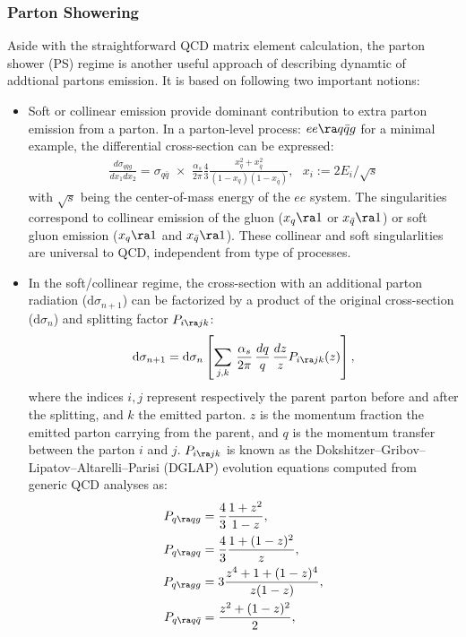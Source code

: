 \subsubsection{Parton Showering}
Aside with the straightforward  QCD matrix element calculation,
the parton shower (PS) regime is another useful approach of describing dynamtic of addtional partons emission.
It is based on following two important notions:

\begin{itemize}
\item Soft or collinear emission provide dominant contribution to extra parton emission from a parton.
In a parton-level process: $ee \ra q\bar{q} g$ for a minimal example, the differential cross-section can be expressed:
\begin{align}
\frac{d\sigma_{q\bar{q}g}}{dx_1 dx_2} = \sigma_{q\bar{q}} \,\, \times \,\, \frac{\alpha_s}{2\pi} \frac{4}{3} \frac{x_q^2+x_{\bar{q}}^2}{(1-x_q)(1-x_{\bar{q}})}, \,\,\,\, x_i := 2E_i/\sqrt{s}
\end{align}
with $\sqrt{s}$ being the center-of-mass energy of the $ee$ system.
The singularities correspond to collinear emission of the gluon ($x_q \ra 1$ or $x_{\bar{q}} \ra 1$) or soft gluon emission ($x_q \ra 1$ and $x_{\bar{q}} \ra 1$).
These collinear and soft singularlities are universal to QCD, independent from type of processes. \\

\item In the soft/collinear regime, the cross-section with an additional parton radiation ($\mathrm{d}\sigma_{n+1}$) can be factorized by a product of the original cross-section ($\mathrm{d}\sigma_{n}$) and splitting factor $P_{i \ra j k}$:
\begin{align}
\mathrm{d}\sigma_{n+1} = \mathrm{d}\sigma_n \left[ \sum_{j,k} \,  \frac{\alpha_s}{2\pi} \, \frac{dq}{q} \, \frac{dz}{z} P_{i \ra j k} (z) \right],
\end{align}
where the indices $i,j$ represent respectively the parent parton before and after the splitting, and $k$ the emitted parton. 
$z$ is the momentum fraction the emitted parton carrying from the parent, and $q$ is the momentum transfer between the parton $i$ and $j$. $P_{i \ra j k}$ is known as the Dokshitzer–Gribov–Lipatov–Altarelli–Parisi (DGLAP) evolution equations \cite{D_DEGLAP}\cite{L_DEGLAP}\cite{AP_DEGLAP} computed from generic QCD analyses as:
\begin{align}
P_{q \ra qg} & = \frac{4}{3} \frac{1+z^2}{1-z}, \\
P_{q \ra gq} & = \frac{4}{3} \frac{1+(1-z)^2}{z}, \\
P_{q \ra gg} & = 3 \frac{z^4+1+(1-z)^4}{z(1-z)}, \\
P_{q \ra q\bar{q}} & = \frac{z^2+(1-z)^2}{2},
\end{align}
\end{itemize}

